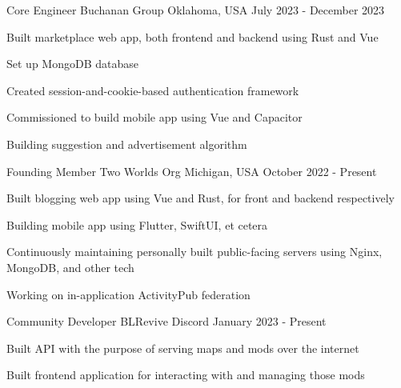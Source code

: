 
\begin{cventries}

   \cventry
   {Core Engineer} %
   {Buchanan Group} %
   {Oklahoma, USA} %
   {July 2023 - December 2023} %
   {
      \begin{cvitems}
         \item {Built marketplace web app, both frontend and backend using Rust and Vue}
         \item {Set up MongoDB database}
         \item {Created session-and-cookie-based authentication framework}
         \item {Commissioned to build mobile app using Vue and Capacitor}
         \item {Building suggestion and advertisement algorithm}
      \end{cvitems}
   }

   \cventry
   {Founding Member} %
   {Two Worlds Org} %
   {Michigan, USA} %
   {October 2022 - Present} %
   {
      \begin{cvitems}
         \item {Built blogging web app using Vue and Rust, for front and backend respectively}
         \item {Building mobile app using Flutter, SwiftUI, et cetera}
         \item {Continuously maintaining personally built public-facing servers using Nginx, MongoDB, and other tech}
         \item {Working on in-application ActivityPub federation}
      \end{cvitems}
   }

   \cventry
   {Community Developer}
   {BLRevive}
   {Discord}
   {January 2023 - Present}
   {
      \begin{cvitems}
         \item {Built API with the purpose of serving maps and mods over the internet}
         \item {Built frontend application for interacting with and managing those mods}
      \end{cvitems}
   }

\end{cventries}
